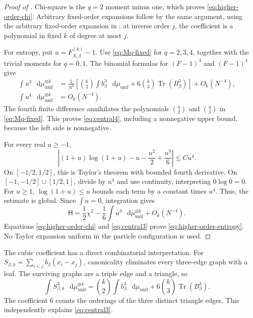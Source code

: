 \documentclass[11pt,reqno]{amsart}
\numberwithin{equation}{section}
\theoremstyle{plain}
\theoremstyle{definition}
\newcommand{\dd}{\mathop{}\!\mathrm d}
\newcommand{\Tr}{\operatorname{Tr}}
\newcommand{\be}{\beta}
\newcommand{\Hr}{\mathsf H}
\newcommand{\muunif}{\mu_{\mathrm{unif}}}
\begin{document}
\begin{proof}[Proof of ]
Chi-square is the $q=2$ moment minus one, which proves \eqref{eq:higher-order-chi}. Arbitrary fixed-order expansions follow by the same argument, using the arbitrary fixed-order expansion in ; at inverse order $j$, the coefficient is a polynomial in fixed $k$ of degree at most $j$.

For entropy, put $u=F_{N,\be}^{(k)}-1$. Use \eqref{eq:Mq-fixed} for $q=2,3,4$, together with the trivial moments for $q=0,1$. The binomial formulas for $(F-1)^3$ and $(F-1)^4$ give
\begin{align}
 \int u^3\,\dd \muunif^{\otimes k}
 &=\frac1{N^3}\left[\binom k2\int b_\be^3\,\dd \muunif
              +6\binom k3\Tr(B_\be^3)\right]+O_k(N^{-4}),\label{eq:central3}\\
 \int u^4\,\dd \muunif^{\otimes k}&=O_k(N^{-4}).\label{eq:central4}
\end{align}
The fourth finite difference annihilates the polynomials $\binom q2$ and $\binom q3$ in \eqref{eq:Mq-fixed}. This proves \eqref{eq:central4}, including a nonnegative upper bound, because the left side is nonnegative.

For every real $u\geq-1$,
\begin{equation}\label{eq:entropy-fourth}
 \left|(1+u)\log(1+u)-u-\frac{u^2}{2}+\frac{u^3}{6}\right|\leq C u^4.
\end{equation}
On $[-1/2,1/2]$, this is Taylor's theorem with bounded fourth derivative. On $[-1,-1/2]\cup[1/2,1]$, divide by $u^4$ and use continuity, interpreting $0\log0=0$. For $u\geq1$, $\log(1+u)\leq u$ bounds each term by a constant times $u^4$. Thus, the estimate is global. Since $\int u=0$, integration gives
\begin{equation}\label{eq:entropy-identity}
 \Hr=\frac12\chi^2-\frac16\int u^3\,\dd \muunif^{\otimes k}+O_k(N^{-4}).
\end{equation}
Equations \eqref{eq:higher-order-chi} and \eqref{eq:central3} prove \eqref{eq:higher-order-entropy}. No Taylor expansion uniform in the particle configuration is used.
\end{proof}

The cubic coefficient has a direct combinatorial interpretation. For $S_{\be,k}=\sum_{i<j}b_\be(x_i-x_j)$, canonicality eliminates every three-edge graph with a leaf. The surviving graphs are a triple edge and a triangle, so
\begin{equation}\label{eq:S-cube}
 \int S_{\be,k}^3\,\dd \muunif^{\otimes k}
 =\binom k2\int b_\be^3\,\dd \muunif+6\binom k3\Tr(B_\be^3).
\end{equation}
The coefficient $6$ counts the orderings of the three distinct triangle edges. This independently explains \eqref{eq:central3}.
\end{document}
